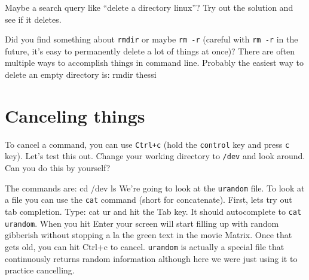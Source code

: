 \documentclass[12pt]{article}
\newenvironment{cmd}{\verbatim}{\endverbatim\vspace{3pt}}
\begin{document}
Maybe a search query like ``delete a directory linux''? Try out the solution and see if it deletes.

\vspace{.4in}

Did you find something about \texttt{rmdir} or maybe \texttt{rm -r} (careful with \texttt{rm -r} in the future, it's easy to permanently delete a lot of things at once)? There are often multiple ways to accomplish things in command line. Probably the easiest way to delete an empty directory is:
\begin{cmd}
  rmdir thessi
\end{cmd}







\section{Canceling things}
To cancel a command, you can use \texttt{Ctrl+c} (hold the \texttt{control} key and press \texttt{c} key). Let's test this out. Change your working directory to \texttt{/dev} and look around. Can you do this by yourself?

\vspace{.4in}
The commands are:
\begin{cmd}
  cd /dev
  ls
\end{cmd}
We're going to look at the \texttt{urandom} file. To look at a file you can use the \texttt{cat} command (short for concatenate). First, lets try out tab completion. Type:
\begin{cmd}
  cat ur
\end{cmd}
and hit the Tab key. It should autocomplete to \texttt{cat urandom}. When you hit Enter your screen will start filling up with random gibberish without stopping a la the green text in the movie Matrix. Once that gets old, you can hit Ctrl+c to cancel. \texttt{urandom} is actually a special file that continuously returns random information although here we were just using it to practice cancelling.
\end{document}
